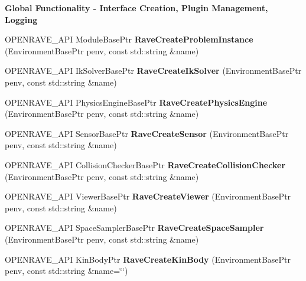 \begin{Indent}{\bf Global Functionality -\/ Interface Creation, Plugin Management, Logging}
\begin{DoxyCompactItemize}
\item 
\hypertarget{namespaceOpenRAVE_a86c93d7a94a21155ab171b9d919e18b7}{
OPENRAVE\_\-API ModuleBasePtr {\bfseries RaveCreateProblemInstance} (EnvironmentBasePtr penv, const std::string \&name)}
\label{namespaceOpenRAVE_a86c93d7a94a21155ab171b9d919e18b7}

\item 
\hypertarget{namespaceOpenRAVE_aed5d72a201e6c1aaf8c8bed8d1774099}{
OPENRAVE\_\-API IkSolverBasePtr {\bfseries RaveCreateIkSolver} (EnvironmentBasePtr penv, const std::string \&name)}
\label{namespaceOpenRAVE_aed5d72a201e6c1aaf8c8bed8d1774099}

\item 
\hypertarget{namespaceOpenRAVE_ad46a55479cbfec752468034a3a17db22}{
OPENRAVE\_\-API PhysicsEngineBasePtr {\bfseries RaveCreatePhysicsEngine} (EnvironmentBasePtr penv, const std::string \&name)}
\label{namespaceOpenRAVE_ad46a55479cbfec752468034a3a17db22}

\item 
\hypertarget{namespaceOpenRAVE_a72ea3052fbb09a2d68f757c3582426b9}{
OPENRAVE\_\-API SensorBasePtr {\bfseries RaveCreateSensor} (EnvironmentBasePtr penv, const std::string \&name)}
\label{namespaceOpenRAVE_a72ea3052fbb09a2d68f757c3582426b9}

\item 
\hypertarget{namespaceOpenRAVE_a78b34b954b8d25acb7269b273dce1b29}{
OPENRAVE\_\-API CollisionCheckerBasePtr {\bfseries RaveCreateCollisionChecker} (EnvironmentBasePtr penv, const std::string \&name)}
\label{namespaceOpenRAVE_a78b34b954b8d25acb7269b273dce1b29}

\item 
\hypertarget{namespaceOpenRAVE_adb3931606554988bbb34d8f0b4e28341}{
OPENRAVE\_\-API ViewerBasePtr {\bfseries RaveCreateViewer} (EnvironmentBasePtr penv, const std::string \&name)}
\label{namespaceOpenRAVE_adb3931606554988bbb34d8f0b4e28341}

\item 
\hypertarget{namespaceOpenRAVE_aa6cac9a3b2135a8c2bc3cd68abeb2b5a}{
OPENRAVE\_\-API SpaceSamplerBasePtr {\bfseries RaveCreateSpaceSampler} (EnvironmentBasePtr penv, const std::string \&name)}
\label{namespaceOpenRAVE_aa6cac9a3b2135a8c2bc3cd68abeb2b5a}

\item 
\hypertarget{namespaceOpenRAVE_ab93068e1f0c7ab62caff93395d48f543}{
OPENRAVE\_\-API KinBodyPtr {\bfseries RaveCreateKinBody} (EnvironmentBasePtr penv, const std::string \&name=\char`\"{}\char`\"{})}
\label{namespaceOpenRAVE_ab93068e1f0c7ab62caff93395d48f543}


\end{DoxyCompactItemize}
\end{Indent}
